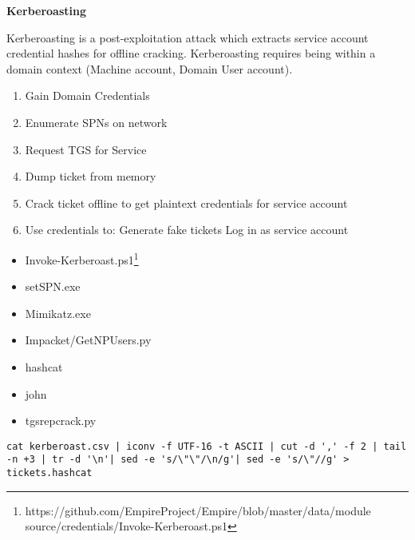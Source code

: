 \documentclass[a4paper,10pt]{article}
\begin{document}
\newpage
\Huge{\textbf{Kerberoasting}}
\newline
\normalsize
\vspace{1cm}
\begin{tcolorbox}[breakable,title=Notes]
Kerberoasting is a post-exploitation attack which extracts service account credential hashes for offline cracking.
Kerberoasting requires being within a domain context (Machine account, Domain User account).
\begin{enumerate}
	\itemsep0em
	\item Gain Domain Credentials
	\item Enumerate SPNs on network
	\item Request TGS for Service
	\item Dump ticket from memory
	\item Crack ticket offline to get plaintext credentials for service account
	\item Use credentials to:
	\subitem Generate fake tickets
	\subitem Log in as service account
\end{enumerate}
\end{tcolorbox}
\begin{tcolorbox}[breakable,title=Windows Tools and Scripts]
\begin{itemize}
	\itemsep0em
	\item Invoke-Kerberoast.ps1\footnote{https://github.com/EmpireProject/Empire/blob/master/data/module
		source/credentials/Invoke-Kerberoast.ps1}
	\item setSPN.exe
	\item Mimikatz.exe
\end{itemize}
\end{tcolorbox}
\begin{tcolorbox}[breakable,title=Linux Tools and Scripts]
\begin{itemize}
	\itemsep0em
	\item Impacket/GetNPUsers.py
	\item hashcat
	\item john
	\item tgsrepcrack.py
\end{itemize}
\end{tcolorbox}
\begin{tcolorbox}[title={Script to convert from Invoke-Kerberoast csv to Hashcat if not copy/pasted},breakable]
	\footnotesize
	\begin{verbatim}
cat kerberoast.csv | iconv -f UTF-16 -t ASCII | cut -d ',' -f 2 | tail -n +3 | tr -d '\n'| sed -e 's/\"\"/\n/g'| sed -e 's/\"//g' > tickets.hashcat
	\end{verbatim}
\end{tcolorbox}
\end{document}
